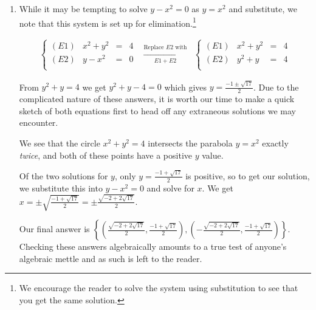 \documentclass{ximera}
\begin{document}
\begin{example}
\begin{explanation}
\begin{enumerate}
\begin{center}
\end{center}

\item  While it may be tempting to solve $y-x^2=0$ as $y=x^2$ and substitute, we note that this system is set up for elimination.\footnote{We encourage the reader to solve the system using substitution to see that you get the same solution.}  

\[ \begin{array}{ccc}

\left\{\begin{array}{lrcr} (E1) &  x^2 +y^2 & = & 4 \\ (E2) & y - x^2 & = & 0 \\ \end{array} \right.

&

\xrightarrow[\text{$E1 + E2$}]{\text{Replace $E2$ with}}

&

\left\{\begin{array}{lrcr} (E1) &  x^2 +y^2 & = & 4 \\ (E2) & y^2 +y  & = & 4 \\ \end{array} \right.

\end{array} \]

From $y^2 + y = 4$ we get $y^2+y-4 = 0$ which gives $y = \frac{-1 \pm \sqrt{17}}{2}$.  Due to the complicated nature of these answers, it is worth our time to make a quick sketch of both equations first to head off any extraneous solutions we may encounter.  

\begin{center}
\end{center}


We see that the circle $x^2+y^2=4$ intersects the parabola $y=x^2$ exactly \textit{twice}, and both of these points have a positive $y$ value.  

Of the two solutions for $y$, only $y = \frac{-1 + \sqrt{17}}{2}$ is positive, so to get our solution, we substitute this into $y - x^2 = 0$ and solve for $x$.  We get $x = \pm \sqrt{\frac{-1 + \sqrt{17}}{2}} = \pm \frac{\sqrt{-2 + 2\sqrt{17}}}{2}$. 

Our final answer is $\left\{ \left(\frac{\sqrt{-2 + 2\sqrt{17}}}{2},\frac{-1 + \sqrt{17}}{2}\right),\left(-\frac{\sqrt{-2 + 2\sqrt{17}}}{2},\frac{-1 + \sqrt{17}}{2}\right) \right\}$.  Checking these answers algebraically amounts to a true test of anyone's algebraic mettle and as such is left to the reader.






\end{enumerate}

\end{explanation}

\end{example}
\end{document}
